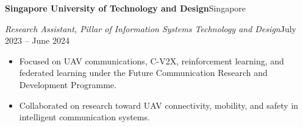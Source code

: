 \documentclass[10pt,a4paper]{article}
\newcommand{\datedentry}[4]{
  \textbf{#1}\hfill #2\par
  \textit{#3}\hfill #4\par
}
\begin{document}
\datedentry{Singapore University of Technology and Design}{Singapore}{Research Assistant, Pillar of Information Systems Technology and Design}{July 2023 -- June 2024}
\begin{itemize}
  \item Focused on UAV communications, C-V2X, reinforcement learning, and federated learning under the Future Communication Research and Development Programme.
  \item Collaborated on research toward UAV connectivity, mobility, and safety in intelligent communication systems.
\end{itemize}

\end{document}
